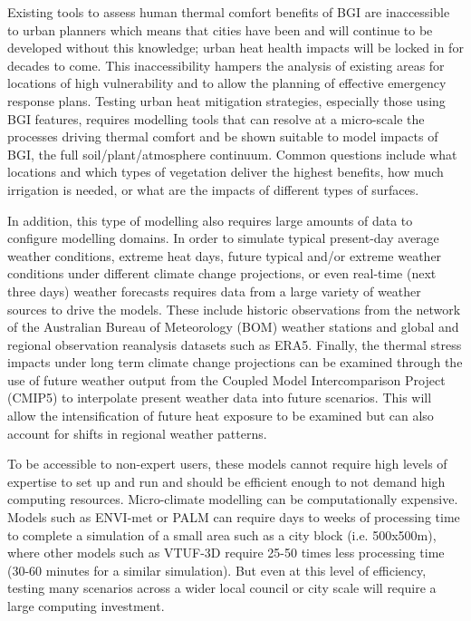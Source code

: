 Existing tools to assess human thermal comfort benefits of BGI are inaccessible to urban planners which means that cities have been and will continue to be developed without this knowledge; urban heat health impacts will be locked in for decades to come. This inaccessibility hampers the analysis of existing areas for locations of high vulnerability and to allow the planning of effective emergency response plans. Testing urban heat mitigation strategies, especially those using BGI features, requires modelling tools that can resolve at a micro-scale the processes driving thermal comfort and be shown suitable to model impacts of BGI, the full soil/plant/atmosphere continuum. Common questions include what locations and which types of vegetation deliver the highest benefits, how much irrigation is needed, or what are the impacts of different types of surfaces.

In addition, this type of modelling also requires large amounts of data to configure modelling domains. In order to simulate typical present-day average weather conditions, extreme heat days, future typical and/or extreme weather conditions under different climate change projections, or even real-time (next three days) weather forecasts requires data from a large variety of weather sources to drive the models. These include historic observations from the network of the Australian Bureau of Meteorology (BOM) weather stations\cite{AuGovBOM2020} and global and regional observation reanalysis datasets such as ERA5\cite{Hersbach2020}. Finally, the thermal stress impacts under long term climate change projections can be examined through the use of future weather output from the Coupled Model Intercomparison Project (CMIP5)\cite{Taylor2012} to interpolate present weather data into future scenarios. This will allow the intensification of future heat exposure to be examined but can also account for shifts in regional weather patterns.

To be accessible to non-expert users, these models cannot require high levels of expertise to set up and run and should be efficient enough to not demand high computing resources. Micro-climate modelling can be computationally expensive. Models such as ENVI-met or PALM can require days to weeks of processing time to complete a simulation of a small area such as a city block (i.e. 500x500m), where other models such as VTUF-3D require 25-50 times less processing time (30-60 minutes for a similar simulation). But even at this level of efficiency, testing many scenarios across a wider local council or city scale will require a large computing investment. 

